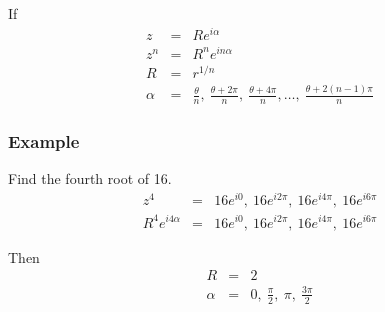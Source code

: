 \begin{frame}
  If 
  \begin{eqnarray*}
    z & = & R e^{i\alpha} \\
    z^n & = & R^n e^{i n\alpha} \\
    R & = & r^{1/n} \\
    \alpha & = & \frac{\theta}{n}, ~ \frac{\theta+2\pi}{n}, ~
    \frac{\theta+4\pi}{n}, \ldots, ~ \frac{\theta+2(n-1)\pi}{n}
  \end{eqnarray*}
\end{frame}

\begin{frame}
  \frametitle{Example}

  Find the fourth root of 16.
  \begin{eqnarray*}
    z^4 & = & 16 e^{i0}, ~ 16 e^{i2\pi}, ~ 16 e^{i4\pi}, ~ 16 e^{i6\pi} \\
    R^4 e^{i4\alpha} & = & 16 e^{i0}, ~ 16 e^{i2\pi}, ~ 16 e^{i4\pi}, ~ 16 e^{i6\pi} 
  \end{eqnarray*}

  Then
  \begin{eqnarray*}
    R & = & 2 \\
    \alpha & = & 0, ~ \frac{\pi}{2}, ~ \pi, ~ \frac{3\pi}{2}
  \end{eqnarray*}

\end{frame}


